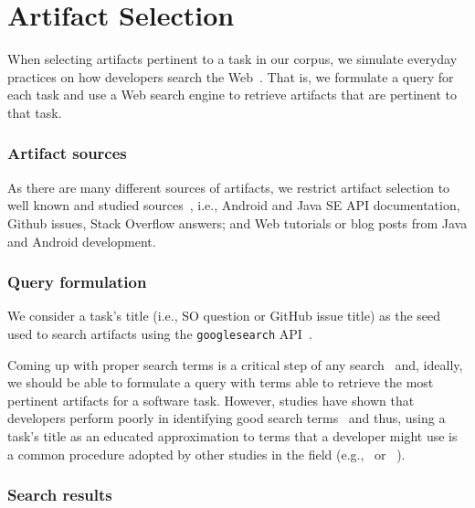 
\section{Artifact Selection}
\label{cp4:corpus-artifacts}


When selecting artifacts pertinent to a task in our corpus, we simulate everyday practices on how developers search the Web~\cite{rao2020, Xia2017}. That is, we formulate a query for each task and use a Web search engine to retrieve artifacts that are pertinent to that task.


\subsubsection{Artifact sources}

As there are many different sources of artifacts, we restrict artifact selection to well known and studied sources~\cite{Starke2009,Kevic2014, Li2013}, i.e.,
Android and Java SE API documentation, Github issues, Stack Overflow answers; and Web tutorials or blog posts from Java and Android development.



\subsubsection{Query formulation}



We consider a task's title (i.e., SO question or GitHub issue title) as the seed used to search artifacts
using the \texttt{googlesearch} API~\cite{googlesearch}.


Coming up with proper search terms is a critical step of any search~\cite{Haiduc2013}
and, ideally, we should be able to formulate a query with terms able to retrieve the most pertinent artifacts for a software task.
However, studies have shown that developers perform poorly in identifying good search terms~\cite{Starke2009,Kevic2014, Li2013} and thus, using a task's title
as an educated approximation to terms that a developer might use is a common procedure adopted by other studies in the field (e.g.,~\cite{Xu2017} or ~\cite{Silva2019}).







\subsubsection{Search results}


